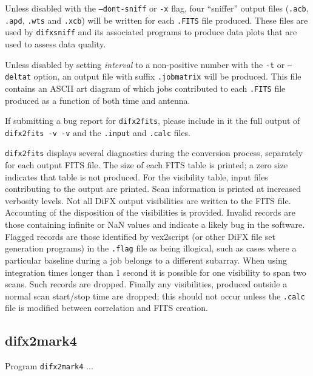 Unless disabled with the {\tt --dont-sniff} or {\tt -x} flag, four ``sniffer'' output files ({\tt .acb}, {\tt .apd}, {\tt .wts} and {\tt .xcb}) will be written for each {\tt .FITS} file produced.  
These files are used by {\tt difxsniff} and its associated programs to produce data plots that are used to assess data quality.

Unless disabled by setting {\em interval} to a non-positive number with the {\tt -t} or {\tt --deltat} option, an output file with suffix {\tt .jobmatrix} will be produced. 
This file contains an ASCII art diagram of which jobs contributed to each {\tt .FITS} file produced as a function of both time and antenna.

If submitting a bug report for {\tt difx2fits}, please include in it the full output of {\tt difx2fits -v -v} and the {\tt .input} and {\tt .calc} files.

{\tt difx2fits} displays several diagnostics during the conversion process, separately for each output FITS file.
The size of each FITS table is printed; a zero size indicates that table is not produced.
For the visibility table, input files contributing to the output are printed.
Scan information is printed at increased verbosity levels.
Not all DiFX output visibilities are written to the FITS file.
Accounting of the disposition of the visibilities is provided.
Invalid records are those containing infinite or NaN values and indicate a likely bug in the software.
Flagged records are those identified by vex2script (or other DiFX file set generation programs) in the {\tt .flag} file as being illogical, such as cases where a particular baseline during a job belongs to a different subarray.
When using integration times longer than 1 second it is possible for one visibility to span two scans.  
Such records are dropped.
Finally any visibilities, produced outside a normal scan start/stop time are dropped; this should not occur unless the {\tt .calc} file is modified between correlation and FITS creation.








\subsection{difx2mark4} \label{sec:difx2mark4}

Program {\tt difx2mark4} ...





